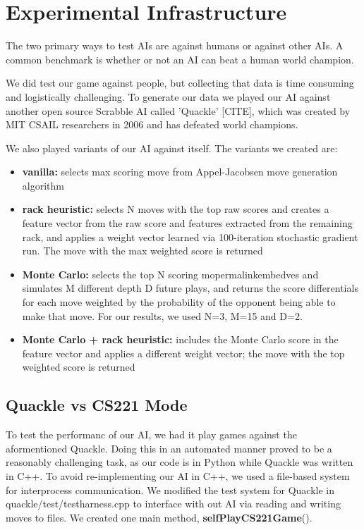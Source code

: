 \documentclass[12pt]{article}
\begin{document}

\section*{Experimental Infrastructure}
The two primary ways to test AIs are against humans or against other
AIs. A common benchmark is whether or not an AI can beat a human world
champion.

We did test our game against people, but collecting that data is time
consuming and logistically challenging. To generate our data we played
our AI against another open source Scrabble AI called 'Quackle'
[CITE], which was created by MIT CSAIL researchers in 2006 and has
defeated world champions.

We also played variants of our AI against itself. The variants we
created are:
\begin{itemize}
\item \textbf{vanilla:} selects max scoring move from Appel-Jacobsen
  move generation algorithm
\item \textbf{rack heuristic:} selects N moves with the top raw scores
  and creates a feature vector from the raw score and features
  extracted from the remaining rack, and applies a weight vector
  learned via 100-iteration stochastic gradient run. The move with the
  max weighted score is returned
\item \textbf{Monte Carlo:} selects the top N scoring mopermalinkembedves and
  simulates M different depth D future plays, and returns the score
  differentials for each move weighted by the probability of the
  opponent being able to make that move. For our results, we used N=3,
  M=15 and D=2.
\item \textbf{Monte Carlo + rack heuristic:} includes the Monte Carlo
  score in the feature vector and applies a different weight vector;
  the move with the top weighted score is returned
\end{itemize}

\subsection*{Quackle vs CS221 Mode}
To test the performanc of our AI, we had it play games against the aformentioned Quackle. 
Doing this in an automated manner proved to be a reasonably challenging task,
as our code is in Python while Quackle was written in
C++. To avoid re-implementing our AI in C++, we used a file-based
system for interprocess communication. We modified the test system for
Quackle in quackle/test/testharness.cpp to interface with out AI via
reading and writing moves to files. We created one main method,
\textbf{selfPlayCS221Game}().
\end{document}
